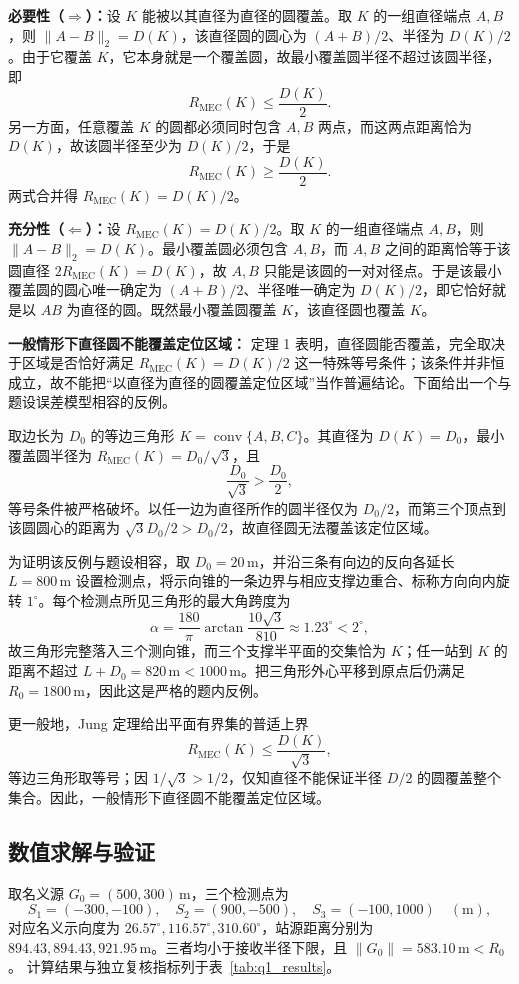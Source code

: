 \textbf{必要性（$\Rightarrow$）：}设 $K$ 能被以其直径为直径的圆覆盖。取 $K$ 的一组直径端点 $A,B$，则 $\lVert A-B\rVert_2=D(K)$，该直径圆的圆心为 $(A+B)/2$、半径为 $D(K)/2$。由于它覆盖 $K$，它本身就是一个覆盖圆，故最小覆盖圆半径不超过该圆半径，即
\[
R_{\mathrm{MEC}}(K)\le\frac{D(K)}2.
\]
另一方面，任意覆盖 $K$ 的圆都必须同时包含 $A,B$ 两点，而这两点距离恰为 $D(K)$，故该圆半径至少为 $D(K)/2$，于是
\[
R_{\mathrm{MEC}}(K)\ge\frac{D(K)}2.
\]
两式合并得 $R_{\mathrm{MEC}}(K)=D(K)/2$。

\textbf{充分性（$\Leftarrow$）：}设 $R_{\mathrm{MEC}}(K)=D(K)/2$。取 $K$ 的一组直径端点 $A,B$，则 $\lVert A-B\rVert_2=D(K)$。最小覆盖圆必须包含 $A,B$，而 $A,B$ 之间的距离恰等于该圆直径 $2R_{\mathrm{MEC}}(K)=D(K)$，故 $A,B$ 只能是该圆的一对对径点。于是该最小覆盖圆的圆心唯一确定为 $(A+B)/2$、半径唯一确定为 $D(K)/2$，即它恰好就是以 $AB$ 为直径的圆。既然最小覆盖圆覆盖 $K$，该直径圆也覆盖 $K$。

\textbf{一般情形下直径圆不能覆盖定位区域：}
定理 1 表明，直径圆能否覆盖，完全取决于区域是否恰好满足 $R_{\mathrm{MEC}}(K)=D(K)/2$ 这一特殊等号条件；该条件并非恒成立，故不能把“以直径为直径的圆覆盖定位区域”当作普遍结论。下面给出一个与题设误差模型相容的反例。

取边长为 $D_0$ 的等边三角形 $K=\operatorname{conv}\{A,B,C\}$。其直径为 $D(K)=D_0$，最小覆盖圆半径为 $R_{\mathrm{MEC}}(K)=D_0/\sqrt3$，且
\[
\frac{D_0}{\sqrt3}>\frac{D_0}{2},
\]
等号条件被严格破坏。以任一边为直径所作的圆半径仅为 $D_0/2$，而第三个顶点到该圆圆心的距离为 $\sqrt3D_0/2>D_0/2$，故直径圆无法覆盖该定位区域。

为证明该反例与题设相容，取 $D_0=20\,\mathrm m$，并沿三条有向边的反向各延长 $L=800\,\mathrm m$ 设置检测点，将示向锥的一条边界与相应支撑边重合、标称方向向内旋转 $1^\circ$。每个检测点所见三角形的最大角跨度为
\[
\alpha=\frac{180}{\pi}\arctan\frac{10\sqrt3}{810}\approx1.23^\circ<2^\circ,
\]
故三角形完整落入三个测向锥，而三个支撑半平面的交集恰为 $K$；任一站到 $K$ 的距离不超过 $L+D_0=820\,\mathrm m<1000\,\mathrm m$。把三角形外心平移到原点后仍满足 $R_0=1800\,\mathrm m$，因此这是严格的题内反例。

更一般地，Jung 定理给出平面有界集的普适上界
\[
R_{\mathrm{MEC}}(K)\le\frac{D(K)}{\sqrt3},
\]
等边三角形取等号；因 $1/\sqrt3>1/2$，仅知直径不能保证半径 $D/2$ 的圆覆盖整个集合\cite{jung1901}。因此，一般情形下直径圆不能覆盖定位区域。

\subsection{数值求解与验证}
取名义源 $G_0=(500,300)\,\mathrm m$，三个检测点为
\[
S_1=(-300,-100),\quad S_2=(900,-500),\quad S_3=(-100,1000)\quad(\mathrm m),
\]
对应名义示向度为 $26.57^\circ,116.57^\circ,310.60^\circ$，站源距离分别为 $894.43,894.43,921.95\,\mathrm m$。三者均小于接收半径下限，且 $\lVert G_0\rVert=583.10\,\mathrm m<R_0$。
计算结果与独立复核指标列于表~\ref{tab:q1_results}。

